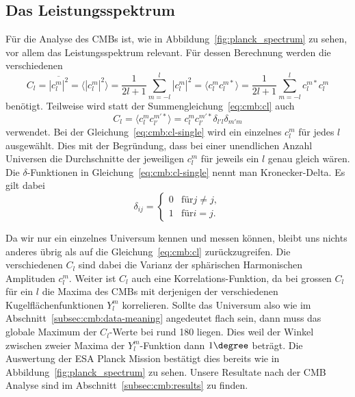 \subsection{Das Leistungsspektrum}

Für die Analyse des CMBs ist, wie in Abbildung~\ref{fig:planck_spectrum} zu 
sehen, vor allem das Leistungsspektrum relevant. Für dessen Berechnung werden 
die verschiedenen
\begin{equation}
	C_l = \overline{|c_l^m|^2} = \langle |c_l^m|^2 \rangle =  \frac{1}{2l + 
	1}\sum_{m=-l}^{l}|c_l^m|^2 = \langle c_l^m 
	c_l^{m*} \rangle = 
	\frac{1}{2l + 
	1}\sum_{m=-l}^{l}c_l^{m*}c_l^m
	\label{eq:cmb:cl}
\end{equation}
benötigt. Teilweise wird statt der Summengleichung~\ref{eq:cmb:cl} auch
\begin{equation*}
	C_l = \langle c_{l}^{m}c_{l'}^{m'*} \rangle = 
	c_{l}^{m}c_{l'}^{m'*}\delta_{l'l}\delta_{m'm}
	\label{eq:cmb:cl-single}
\end{equation*}
verwendet. Bei der Gleichung~\ref{eq:cmb:cl-single} wird ein einzelnes 
$c_l^m$ für jedes $l$ ausgewählt. Dies mit der Begründung, dass bei einer 
unendlichen Anzahl Universen die Durchschnitte der jeweiligen $c_l^m$ für 
jeweils ein $l$ genau gleich wären. \cite{cmb_klauber} Die $\delta$-Funktionen 
in Gleichung~\ref{eq:cmb:cl-single} nennt man Kronecker-Delta. Es gilt dabei
\begin{equation}
	\delta_{ij} =
	\begin{cases}
		0 & \text{für} j \neq j, \\
		1 & \text{für} i = j.
	\end{cases}
\end{equation}

Da wir nur ein einzelnes Universum kennen und messen können, bleibt uns 
nichts anderes übrig als auf die Gleichung~\ref{eq:cmb:cl} zurückzugreifen. Die 
verschiedenen $C_l$ sind dabei die Varianz der sphärischen Harmonischen 
Amplituden $c_l^m$. Weiter ist $C_l$ auch eine Korrelations-Funktion, da bei 
grossen $C_l$ für ein $l$ die Maxima des CMBs mit derjenigen der verschiedenen 
Kugelflächenfunktionen $Y_l^m$ korrelieren. Sollte das Universum also wie im 
Abschnitt~\ref{subsec:cmb:data-meaning} angedeutet flach sein, dann muss das 
globale Maximum der $C_l$-Werte bei rund 180 liegen. Dies weil der Winkel 
zwischen zweier Maxima der $Y_l^m$-Funktion dann $1\degree$ beträgt. Die 
Auswertung der ESA Planck Mission bestätigt dies bereits wie in 
Abbildung~\ref{fig:planck_spectrum} zu sehen. Unsere Resultate nach der CMB 
Analyse sind im Abschnitt~\ref{subsec:cmb:results} zu finden.
